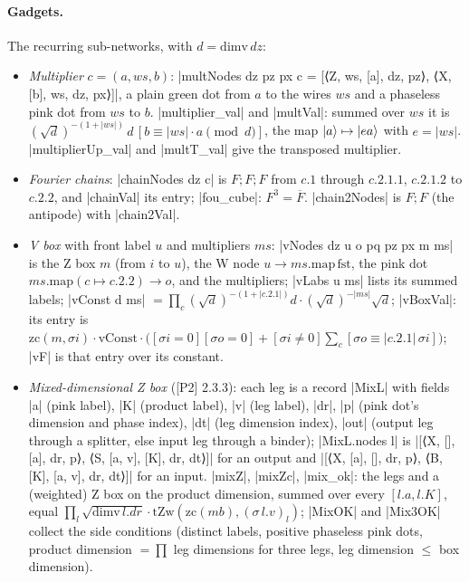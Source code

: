 \paragraph{Gadgets.} The recurring sub-networks, with $d=\mathrm{dimv}\,dz$:
\begin{itemize}
\item \emph{Multiplier} $c=(a,ws,b)$: \lean|multNodes dz pz px c = [⟨Z, ws, [a], dz, pz⟩, ⟨X, [b], ws, dz, px⟩]|,
  a plain green dot from $a$ to the wires $ws$ and a phaseless pink dot from $ws$ to $b$.
  \lean|multiplier_val| and \lean|multVal|: summed over $ws$ it is
  $(\sqrt d)^{-(1+|ws|)}\,d\,[b\equiv|ws|\cdot a\pmod d]$, the map $\lvert a \rangle\mapsto\lvert ea \rangle$ with
  $e=|ws|$. \lean|multiplierUp_val| and \lean|multT_val| give the transposed multiplier.
\item \emph{Fourier chains}: \lean|chainNodes dz c| is $F;F;F$ from $c.1$ through $c.2.1.1$,
  $c.2.1.2$ to $c.2.2$, and \lean|chainVal| its entry; \lean|fou_cube|: $F^3=\overline F$.
  \lean|chain2Nodes| is $F;F$ (the antipode) with \lean|chain2Val|.
\item \emph{V box} with front label $u$ and multipliers $ms$: \lean|vNodes dz u o pq pz px m ms| is
  the Z box $m$ (from $i$ to $u$), the W node $u\to ms.\mathrm{map\,fst}$, the pink dot
  $ms.\mathrm{map}(c\mapsto c.2.2)\to o$, and the multipliers; \lean|vLabs u ms| lists its summed
  labels; \lean|vConst d ms| $=\prod_{c}(\sqrt d)^{-(1+|c.2.1|)}d\cdot(\sqrt d)^{-|ms|}\sqrt d$;
  \lean|vBoxVal|: its entry is $\mathrm{zc}(m,\sigma i)\cdot\mathrm{vConst}\cdot
  \bigl([\sigma i=0][\sigma o=0]+[\sigma i\ne0]\sum_c[\sigma o\equiv|c.2.1|\,\sigma i]\bigr)$;
  \lean|vF| is that entry over its constant.
\item \emph{Mixed-dimensional Z box} ([P2] 2.3.3): each leg is a record
  \lean|MixL| with fields \lean|a| (pink label), \lean|K| (product label), \lean|v| (leg label),
  \lean|dr|, \lean|p| (pink dot's dimension and phase index), \lean|dt| (leg dimension index),
  \lean|out| (output leg through a splitter, else input leg through a binder);
  \lean|MixL.nodes l| is \lean|[⟨X, [], [a], dr, p⟩, ⟨S, [a, v], [K], dr, dt⟩]| for an output and
  \lean|[⟨X, [a], [], dr, p⟩, ⟨B, [K], [a, v], dr, dt⟩]| for an input. \lean|mixZ|, \lean|mixZc|,
  \lean|mix_ok|: the legs and a (weighted) Z box on the product dimension, summed over every
  $[l.a,l.K]$, equal $\prod_l\sqrt{\mathrm{dimv}\,l.dr}\cdot\mathrm{tZw}(\mathrm{zc}(mb),
  (\sigma\,l.v)_l)$; \lean|MixOK| and \lean|Mix3OK| collect the side conditions (distinct labels,
  positive phaseless pink dots, product dimension $=\prod$ leg dimensions for three legs, leg
  dimension $\le$ box dimension).
\end{itemize}

